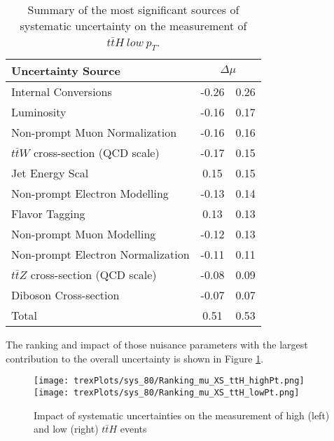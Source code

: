 \begin{table}[H]
    \centering
    \begin{tabular}{l|cc}
        \hline\hline
        Uncertainty Source & \multicolumn{2}{c}{$\Delta \mu$ }  \\
        \hline
        Internal Conversions & -0.26 & 0.26 \\
        Luminosity & -0.16 & 0.17 \\
        Non-prompt Muon Normalization & -0.16 & 0.16 \\
        $t\bar{t}W$ cross-section (QCD scale) & -0.17 & 0.15 \\
        Jet Energy Scal & 0.15 & 0.15 \\
        Non-prompt Electron Modelling & -0.13 & 0.14 \\
        Flavor Tagging & 0.13 & 0.13 \\
        Non-prompt Muon Modelling & -0.12 & 0.13 \\
        Non-prompt Electron Normalization & -0.11 & 0.11 \\
        $t\bar{t}Z$ cross-section (QCD scale) & -0.08 & 0.09 \\
        Diboson Cross-section & -0.07 & 0.07 \\
        \hline           
        Total & 0.51 & 0.53 \\
        \hline\hline
    \end{tabular}
    \caption{Summary of the most significant sources of systematic uncertainty on the measurement of $t\bar{t}H\ low\ p_T$.}
    \label{tab:systematics_low_80}
\end{table}

The ranking and impact of those nuisance parameters with the largest contribution to the overall uncertainty is shown in Figure \ref{fig:ranking_80}.

\begin{figure}[H]
    \centering
    \texttt{[image: trexPlots/sys\_80/Ranking\_mu\_XS\_ttH\_highPt.png]}%
    \texttt{[image: trexPlots/sys\_80/Ranking\_mu\_XS\_ttH\_lowPt.png]}
    \caption{Impact of systematic uncertainties on the measurement of high \pt (left) and low \pt (right) $t\bar{t}H$ events}
    \label{fig:ranking_80}
\end{figure}


